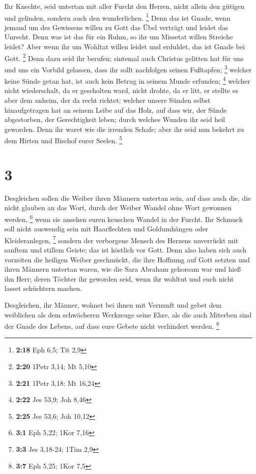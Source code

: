  Ihr Knechte, seid untertan mit aller Furcht den Herren,
nicht allein den gütigen und gelinden, sondern auch den wunderlichen.
\footnote{\textbf{2:18} Eph 6,5; Tit 2,9}  Denn das ist
Gnade, wenn jemand um des Gewissens willen zu Gott das Übel verträgt und
leidet das Unrecht.  Denn was ist das für ein Ruhm, so ihr
um Missetat willen Streiche leidet? Aber wenn ihr um Wohltat willen
leidet und erduldet, das ist Gnade bei Gott. \footnote{\textbf{2:20}
  1Petr 3,14; Mt 5,10}  Denn dazu seid ihr berufen;
sintemal auch Christus gelitten hat für uns und uns ein Vorbild
gelassen, dass ihr sollt nachfolgen seinen Fußtapfen; \footnote{\textbf{2:21}
  1Petr 3,18; Mt 16,24}  welcher keine Sünde getan hat, ist
auch kein Betrug in seinem Munde erfunden; \footnote{\textbf{2:22} Jes
  53,9; Joh 8,46}  welcher nicht wiederschalt, da er
gescholten ward, nicht drohte, da er litt, er stellte es aber dem
anheim, der da recht richtet;  welcher unsere Sünden selbst
hinaufgetragen hat an seinem Leibe auf das Holz, auf dass wir, der Sünde
abgestorben, der Gerechtigkeit leben; durch welches Wunden ihr seid heil
geworden.  Denn ihr waret wie die irrenden Schafe; aber ihr
seid nun bekehrt zu dem Hirten und Bischof eurer Seelen. \footnote{\textbf{2:25}
  Jes 53,6; Joh 10,12}

\hypertarget{section-1}{%
\section{3}\label{section-1}}

 Desgleichen sollen die Weiber ihren Männern untertan sein,
auf dass auch die, die nicht glauben an das Wort, durch der Weiber
Wandel ohne Wort gewonnen werden, \footnote{\textbf{3:1} Eph 5,22; 1Kor
  7,16}  wenn sie ansehen euren keuschen Wandel in der
Furcht.  Ihr Schmuck soll nicht auswendig sein mit
Haarflechten und Goldumhängen oder Kleideranlegen, \footnote{\textbf{3:3}
  Jes 3,18-24; 1Tim 2,9}  sondern der verborgene Mensch des
Herzens unverrückt mit sanftem und stillem Geiste; das ist köstlich vor
Gott.  Denn also haben sich auch vorzeiten die heiligen
Weiber geschmückt, die ihre Hoffnung auf Gott setzten und ihren Männern
untertan waren,  wie die Sara Abraham gehorsam war und hieß
ihn Herr; deren Töchter ihr geworden seid, wenn ihr wohltut und euch
nicht lasset schüchtern machen.

 Desgleichen, ihr Männer, wohnet bei ihnen mit Vernunft und
gebet dem weiblichen als dem schwächeren Werkzeuge seine Ehre, als die
auch Miterben sind der Gnade des Lebens, auf dass eure Gebete nicht
verhindert werden. \footnote{\textbf{3:7} Eph 5,25; 1Kor 7,5}

